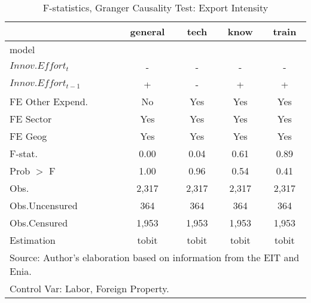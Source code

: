 \begin{table}[htbp]\centering
\def\sym#1{\ifmmode^{#1}\else\(^{#1}\)\fi}
\caption{F-statistics, Granger Causality Test: Export Intensity}
\begin{tabular}{l*{4}{c}}
\hline\hline
                    &     general&        tech&        know&       train\\
\hline
model               &            &            &            &            \\
$Innov.Effort_{t}$  &           -&           -&           -&           -\\
$Innov.Effort_{t-1}$&           +&           -&           +&           +\\
FE Other Expend.    &          No&         Yes&         Yes&         Yes\\
FE Sector           &         Yes&         Yes&         Yes&         Yes\\
FE Geog             &         Yes&         Yes&         Yes&         Yes\\
\hline
F-stat.             &        0.00&        0.04&        0.61&        0.89\\
Prob $>$ F          &        1.00&        0.96&        0.54&        0.41\\
Obs.                &       2,317&       2,317&       2,317&       2,317\\
Obs.Uncensured      &         364&         364&         364&         364\\
Obs.Censured        &       1,953&       1,953&       1,953&       1,953\\
Estimation          &       tobit&       tobit&       tobit&       tobit\\
\hline\hline
\multicolumn{5}{l}{\footnotesize Source: Author's elaboration based on information from the EIT and Enia.}\\
\multicolumn{5}{l}{\footnotesize Control Var: Labor, Foreign Property.}\\
\end{tabular}
\end{table}
